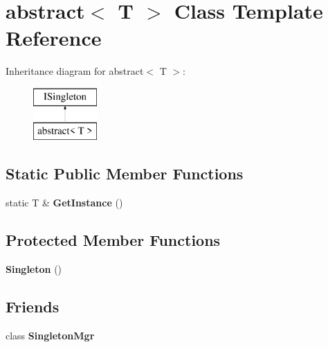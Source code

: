 \hypertarget{classabstract}{}\section{abstract$<$ T $>$ Class Template Reference}
\label{classabstract}
Inheritance diagram for abstract$<$ T $>$\+:\begin{figure}[H]
\begin{center}
\leavevmode
\includegraphics[height=2.000000cm]{classabstract}
\end{center}
\end{figure}
\subsection*{Static Public Member Functions}
\begin{DoxyCompactItemize}
\item 
static T \& {\bfseries Get\+Instance} ()\hypertarget{classabstract_aca9929a78bea316bf71179d83f3512bb}{}\label{classabstract_aca9929a78bea316bf71179d83f3512bb}

\end{DoxyCompactItemize}
\subsection*{Protected Member Functions}
\begin{DoxyCompactItemize}
\item 
{\bfseries Singleton} ()\hypertarget{classabstract_a0f3f510d4b8bb88a7678455ea07e1ec6}{}\label{classabstract_a0f3f510d4b8bb88a7678455ea07e1ec6}

\end{DoxyCompactItemize}
\subsection*{Friends}
\begin{DoxyCompactItemize}
\item 
class {\bfseries Singleton\+Mgr}\hypertarget{classabstract_abc6215f3bdb243af55a8a609d5b373e8}{}\label{classabstract_abc6215f3bdb243af55a8a609d5b373e8}

\end{DoxyCompactItemize}



